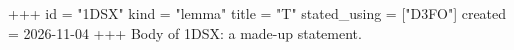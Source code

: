 +++
id = "1DSX"
kind = "lemma"
title = "T"
stated_using = ["D3FO"]
created = 2026-11-04
+++
Body of 1DSX: a made-up statement.
